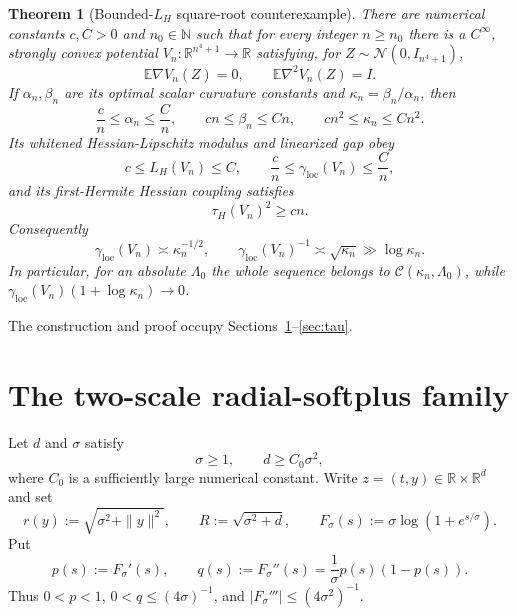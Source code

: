 \documentclass[11pt]{article}
\numberwithin{equation}{section}
\newtheorem{theorem}{Theorem}[section]
\newcommand{\R}{\mathbb R}
\newcommand{\E}{\mathbb E}
\newcommand{\loc}{\mathrm{loc}}
\begin{document}
\begin{theorem}[Bounded-$L_H$ square-root counterexample]\label{thm:main}
There are numerical constants $c,C>0$ and $n_0\in\mathbb N$ such that for
every integer $n\ge n_0$ there is a $C^\infty$, strongly convex potential
$V_n:\R^{n^4+1}\to\R$ satisfying, for
$Z\sim\mathcal N(0,I_{n^4+1})$,
\begin{equation}\label{eq:equilibrium-main}
 \E\nabla V_n(Z)=0,\qquad \E\nabla^2V_n(Z)=I.
\end{equation}
If $\alpha_n,\beta_n$ are its optimal scalar curvature constants and
$\kappa_n=\beta_n/\alpha_n$, then
\begin{equation}\label{eq:main-scales}
 \frac c n\le\alpha_n\le\frac Cn,\qquad
 cn\le\beta_n\le Cn,\qquad
 cn^2\le\kappa_n\le Cn^2.
\end{equation}
Its whitened Hessian-Lipschitz modulus and linearized gap obey
\begin{equation}\label{eq:main-L-gap}
 c\le L_H(V_n)\le C,
 \qquad
 \frac c n\le\gamma_{\loc}(V_n)\le\frac Cn,
\end{equation}
and its first-Hermite Hessian coupling satisfies
\begin{equation}\label{eq:main-tau}
 \tau_H(V_n)^2\ge cn.
\end{equation}
Consequently
\[
 \gamma_{\loc}(V_n)\asymp\kappa_n^{-1/2},
 \qquad
 \gamma_{\loc}(V_n)^{-1}\asymp\sqrt{\kappa_n}\gg\log\kappa_n.
\]
In particular, for an absolute $\Lambda_0$ the whole sequence belongs to
$\mathcal C(\kappa_n,\Lambda_0)$, while
$\gamma_{\loc}(V_n)(1+\log\kappa_n)\to0$.
\end{theorem}

The construction and proof occupy Sections~\ref{sec:family}--\ref{sec:tau}.

\section{The two-scale radial-softplus family}\label{sec:family}

Let $d$ and $\sigma$ satisfy
\begin{equation}\label{eq:parameter-range}
 \sigma\ge1,\qquad d\ge C_0\sigma^2,
\end{equation}
where $C_0$ is a sufficiently large numerical constant.  Write
$z=(t,y)\in\R\times\R^d$ and set
\begin{equation}\label{eq:scaled-profiles}
 r(y):=\sqrt{\sigma^2+\|y\|^2},\qquad
 R:=\sqrt{\sigma^2+d},\qquad
 F_\sigma(s):=\sigma\log(1+e^{s/\sigma}).
\end{equation}
Put
\[
 p(s):=F_\sigma'(s),\qquad
 q(s):=F_\sigma''(s)=\frac1\sigma p(s)(1-p(s)).
\]
Thus $0<p<1$, $0<q\le(4\sigma)^{-1}$, and
$|F_\sigma'''|\le(4\sigma^2)^{-1}$.
\end{document}
